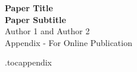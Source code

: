 
\clearpage
\renewcommand\thefigure{OA-\arabic{figure}}
\renewcommand\thetable{OA-\arabic{table}}
\renewcommand*{\thepage}{OA - \arabic{page}}
\renewcommand\thesection{Appendix \Alph{section}}
\renewcommand\thesubsection{\Alph{section}.\arabic{subsection}}
\setcounter{figure}{0}
\setcounter{table}{0}
\setcounter{page}{1}

\begin{center}
	{\huge\textbf{Paper Title}}\\[1em]
	{\huge\textbf{Paper Subtitle}}\\[1em]
	\large Author 1 and Author 2 \\[1em]
	\Large Appendix - For Online Publication \\[1em]
\end{center}

\renewcommand\cftsecdotsep{\cftdotsep}
\renewcommand\cftsubsecdotsep{\cftnodots}
\renewcommand{\cftsecnumwidth}{6em}
\renewcommand{\cftpnumalign}{r}


\renewcommand{\cftsecleader}{\cftdotfill{\cftsecdotsep}\hspace{1.8em}}


\etocdepthtag.toc{appendix}

\tableofcontents
\newpage
